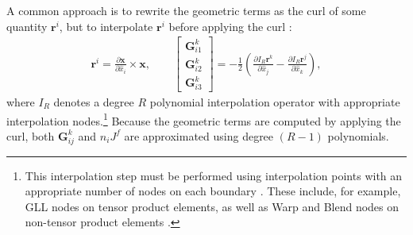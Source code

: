 \documentclass[review]{siamart0216}
\theoremstyle{assumption}
\renewcommand{\hat}[1]{\widehat{#1}}
\newcommand{\pd}[2]{\frac{\partial#1}{\partial#2}}
\newcommand{\LRp}[1]{\left( #1 \right)}
\newcommand{\LRs}[1]{\left[ #1 \right]}
\begin{document}
A common approach is to rewrite the geometric terms as the curl of some quantity $\bm{r}^i$, but to interpolate $\bm{r}^i$ before applying the curl \cite{visbal2002use, kopriva2006metric, hindenlang2012explicit}:
\begin{align}
\bm{r}^i = { \pd{\bm{x}}{\hat{x}_i}\times \bm{x}}, \qquad
\LRs{\begin{array}{c}
\bm{G}^k_{i1}\\
\bm{G}^k_{i2}\\
\bm{G}^k_{i3}\end{array}} = -\frac{1}{2}\LRp{\pd{I_{R}\bm{r}^k}{\hat{x}_j}-\pd{I_{R}\bm{r}^j}{\hat{x}_k}}, 
\label{eq:iconscurl}
\end{align}
where $I_{R}$ denotes a degree ${R}$ polynomial interpolation operator with appropriate interpolation nodes.\footnote{This interpolation step must be performed using interpolation points with an appropriate number of nodes on each boundary \cite{chan2018discretely}.  These include, for example, GLL nodes on tensor product elements, as well as Warp and Blend nodes on non-tensor product elements \cite{warburton2006explicit, chan2015comparison}.}  Because the geometric terms are computed by applying the curl, both $\bm{G}^k_{ij}$ and $n_iJ^f$ are approximated using degree $(R-1)$ polynomials.  
\end{document}
